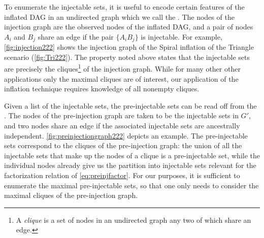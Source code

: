 {To enumerate the injectable sets, it is useful to encode certain features of the inflated DAG in an undirected graph which we call the . The nodes of the injection graph are the observed nodes of the inflated DAG, and a pair of nodes $A_i$ and $B_j$ share an edge if the pair $\{ A_i B_j\}$ is injectable. For example, \cref{fig:injection222} shows the injection graph of the  Spiral inflation of the Triangle scenario (\cref{fig:Tri222}).
The property noted above states that the injectable sets are precisely the cliques\footnote{A \emph{clique} is a set of nodes in an undirected graph any two of which share an edge.} of the injection graph.
While for many other other applications only the maximal cliques are of interest, our application of the inflation technique requires knowledge of all nonempty cliques. 

Given a list of the injectable sets, the pre-injectable sets can be read off from the .
The nodes of the pre-injection graph are taken to be the injectable sets in $G'$, and two nodes share an edge if the associated injectable sets are ancestrally independent. %
\cref{fig:preinjectiongraph222} depicts an example. 
The pre-injectable sets correspond to the cliques of the pre-injection graph: the union of all the injectable sets that make up the nodes of a clique is a pre-injectable set, while the individual nodes already give us the partition into injectable sets relevant for the factorization relation of \cref{eq:preinjfactor}. 
For our purposes, it is sufficient to enumerate the maximal pre-injectable sets, so that one only needs to consider the maximal cliques of the pre-injection graph.


}
